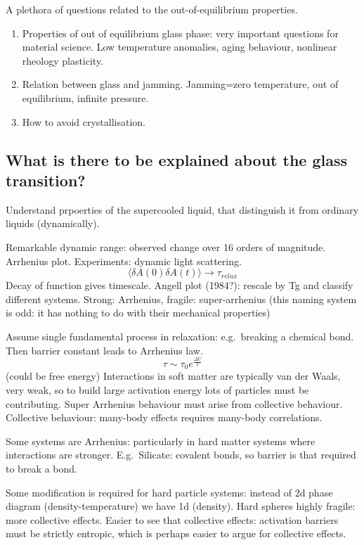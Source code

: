A plethora of questions related to the out-of-equilibrium properties.
\begin{enumerate}
\item Properties of out of equilibrium glass phase: very important questions for material science. Low temperature anomalies, aging behaviour, nonlinear rheology  plasticity.
\item Relation between glass and jamming. Jamming=zero temperature, out of equilibrium, infinite pressure.
\item How to avoid crystallisation.
\end{enumerate}



\subsection{What is there to be explained about the glass transition?}

Understand prpoerties of the supercooled liquid, that distinguish it from ordinary liquids (dynamically).

Remarkable dynamic range: observed change over 16 orders of magnitude.
Arrhenius plot.
Experiments: dynamic light scattering.
\begin{equation}
  \langle \delta A(0) \delta A(t) \rangle
  \to \tau_{relax}
\end{equation}
Decay of function gives timescale.
Angell plot (1984?): rescale by Tg and classify different systems.
Strong: Arrhenius, fragile: super-arrhenius (this naming system is odd: it has nothing to do with their mechanical properties)

Assume single fundamental process in relaxation: e.g.\ breaking a chemical bond.
Then barrier constant leads to Arrhenius law.
\begin{equation}
  \tau \sim \tau_0 e^{\frac{\Delta U}{T}}
\end{equation}
(could be free energy)
Interactions in soft matter are typically van der Waals, very weak, so to build large activation energy lots of particles must be contributing.
Super Arrhenius behaviour must arise from collective behaviour.
Collective behaviour: many-body effects requires many-body correlations.

Some systems are Arrhenius: particularly in hard matter systems where interactions are stronger.
E.g.\ Silicate: covalent bonds, so barrier is that required to break a bond.

Some modification is required for hard particle systems: instead of 2d phase diagram (density-temperature) we have 1d (density).
Hard spheres highly fragile: more collective effects.
Easier to see that collective effects: activation barriers must be strictly entropic, which is perhaps easier to argue for collective effects.

